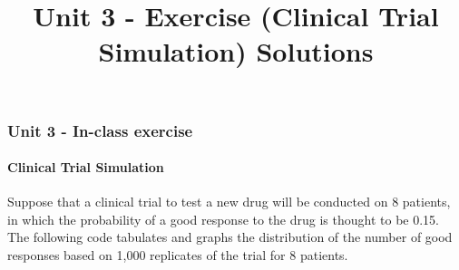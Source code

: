 \documentclass[11pt]{article}
\title{Unit 3 - Exercise (Clinical Trial Simulation) Solutions}
\begin{document}
    
    
    \maketitle
    
    

    
    \hypertarget{unit-3---in-class-exercise}{%
\subsubsection{Unit 3 - In-class
exercise}\label{unit-3---in-class-exercise}}

\hypertarget{clinical-trial-simulation}{%
\paragraph{Clinical Trial Simulation}\label{clinical-trial-simulation}}

Suppose that a clinical trial to test a new drug will be conducted on 8
patients, in which the probability of a good response to the drug is
thought to be 0.15. The following code tabulates and graphs the
distribution of the number of good responses based on 1,000 replicates
of the trial for 8 patients.
\end{document}
